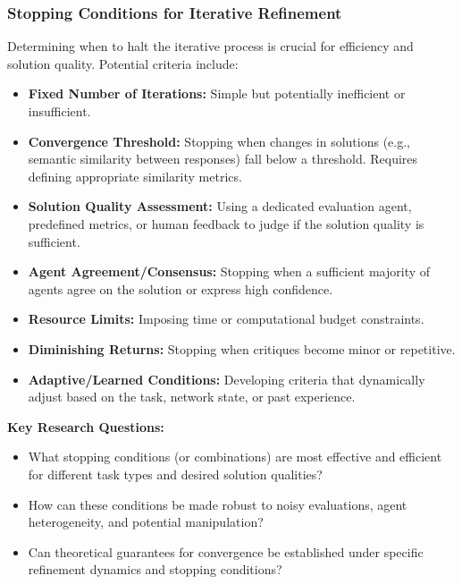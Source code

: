 \documentclass[12pt]{amsart}
\begin{document}
\subsubsection{Stopping Conditions for Iterative Refinement}
\label{subsec:stopping_conditions}
Determining when to halt the iterative process is crucial for efficiency and solution quality. Potential criteria include:
\begin{itemize}[leftmargin=*]
    \item \textbf{Fixed Number of Iterations:} Simple but potentially inefficient or insufficient.
    \item \textbf{Convergence Threshold:} Stopping when changes in solutions (e.g., semantic similarity between responses) fall below a threshold. Requires defining appropriate similarity metrics.
    \item \textbf{Solution Quality Assessment:} Using a dedicated evaluation agent, predefined metrics, or human feedback to judge if the solution quality is sufficient.
    \item \textbf{Agent Agreement/Consensus:} Stopping when a sufficient majority of agents agree on the solution or express high confidence.
    \item \textbf{Resource Limits:} Imposing time or computational budget constraints.
    \item \textbf{Diminishing Returns:} Stopping when critiques become minor or repetitive.
    \item \textbf{Adaptive/Learned Conditions:} Developing criteria that dynamically adjust based on the task, network state, or past experience.
\end{itemize}
\textbf{Key Research Questions:}
\begin{itemize}[leftmargin=*, label={--}]
    \item What stopping conditions (or combinations) are most effective and efficient for different task types and desired solution qualities?
    \item How can these conditions be made robust to noisy evaluations, agent heterogeneity, and potential manipulation?
    \item Can theoretical guarantees for convergence be established under specific refinement dynamics and stopping conditions?
\end{itemize}
\end{document}
